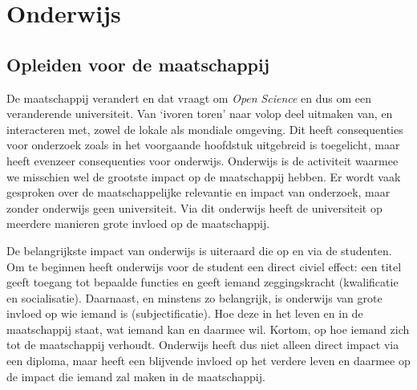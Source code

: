 \documentclass[smallauthor, chapterhaspagenum, nochapterinheader, pagenuminheader,  bigchapnum,medium2, tocpages, garamond, titleinheader]{jote-book}
\begin{document}
	\chapter{Onderwijs }



	\section{Opleiden voor de maatschappij}



	De maatschappij verandert en dat vraagt om \emph{Open }\emph{Science} en dus om een veranderende universiteit. Van ‘ivoren toren' naar volop deel uitmaken van, en interacteren met, zowel de lokale als mondiale omgeving. Dit heeft consequenties voor onderzoek zoals in het voorgaande hoofdstuk uitgebreid is toegelicht, maar heeft evenzeer consequenties voor onderwijs. Onderwijs is de activiteit waarmee we misschien wel de grootste impact op de maatschappij hebben. Er wordt vaak gesproken over de maatschappelijke relevantie en impact van onderzoek, maar zonder onderwijs geen universiteit. Via dit onderwijs heeft de universiteit op meerdere manieren grote invloed op de maatschappij.



	De belangrijkste impact van onderwijs is uiteraard die op en via de studenten. Om te beginnen heeft onderwijs voor de student een direct civiel effect: een titel geeft toegang tot bepaalde functies en geeft iemand zeggingskracht (kwalificatie en socialisatie). Daarnaast, en minstens zo belangrijk, is onderwijs van grote invloed op wie iemand is (subjectificatie). Hoe deze in het leven en in de maatschappij staat, wat iemand kan en daarmee wil. Kortom, op hoe iemand zich tot de maatschappij verhoudt. Onderwijs heeft dus niet alleen direct impact via een diploma, maar heeft een blijvende invloed op het verdere leven en daarmee op de impact die iemand zal maken in de maatschappij.
\end{document}
